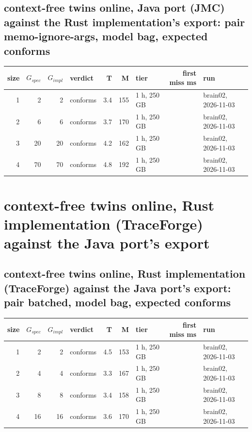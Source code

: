 \documentclass[10pt]{article}
\begin{document}
\subsection*{context-free twins online, Java port (JMC) against the Rust implementation's export: pair \textsf{memo-ignore-args}, model bag, expected conforms}
\begin{longtable}{@{}rrrlrrlrl@{}}
\toprule
size & $G_{\mathit{spec}}$ & $G_{\mathit{impl}}$ & verdict & T & M & tier & first miss ms & run \\
\midrule
\endhead
\color{red} 1 & 2 & 2 & conforms & 3.4 & 155 & 1 h, 250 GB &  & brain02, 2026-11-03 \\
\color{red} 2 & 6 & 6 & conforms & 3.7 & 170 & 1 h, 250 GB &  & brain02, 2026-11-03 \\
\color{red} 3 & 20 & 20 & conforms & 4.2 & 162 & 1 h, 250 GB &  & brain02, 2026-11-03 \\
\color{red} 4 & 70 & 70 & conforms & 4.8 & 192 & 1 h, 250 GB &  & brain02, 2026-11-03 \\
\bottomrule
\end{longtable}
\section*{context-free twins online, Rust implementation (TraceForge) against the Java port's export}
\subsection*{context-free twins online, Rust implementation (TraceForge) against the Java port's export: pair \textsf{batched}, model bag, expected conforms}
\begin{longtable}{@{}rrrlrrlrl@{}}
\toprule
size & $G_{\mathit{spec}}$ & $G_{\mathit{impl}}$ & verdict & T & M & tier & first miss ms & run \\
\midrule
\endhead
\color{red} 1 & 2 & 2 & conforms & 4.5 & 153 & 1 h, 250 GB &  & brain02, 2026-11-03 \\
\color{red} 2 & 4 & 4 & conforms & 3.3 & 167 & 1 h, 250 GB &  & brain02, 2026-11-03 \\
\color{red} 3 & 8 & 8 & conforms & 3.4 & 158 & 1 h, 250 GB &  & brain02, 2026-11-03 \\
\color{red} 4 & 16 & 16 & conforms & 3.6 & 170 & 1 h, 250 GB &  & brain02, 2026-11-03 \\
\bottomrule
\end{longtable}
\end{document}
